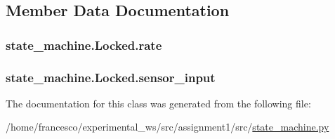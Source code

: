 \subsection{Member Data Documentation}
\subsubsection[{\texorpdfstring{rate}{rate}}]{\setlength{\rightskip}{0pt plus 5cm}state\+\_\+machine.\+Locked.\+rate}\hypertarget{classstate__machine_1_1Locked_a667605824c2d371f1a62b18280a29a02}{}\label{classstate__machine_1_1Locked_a667605824c2d371f1a62b18280a29a02}
\subsubsection[{\texorpdfstring{sensor\+\_\+input}{sensor_input}}]{\setlength{\rightskip}{0pt plus 5cm}state\+\_\+machine.\+Locked.\+sensor\+\_\+input}\hypertarget{classstate__machine_1_1Locked_af607507989a4d5039974490e8abada1a}{}\label{classstate__machine_1_1Locked_af607507989a4d5039974490e8abada1a}


The documentation for this class was generated from the following file\+:\begin{DoxyCompactItemize}
\item 
/home/francesco/experimental\+\_\+ws/src/assignment1/src/\hyperlink{state__machine_8py}{state\+\_\+machine.\+py}\end{DoxyCompactItemize}
